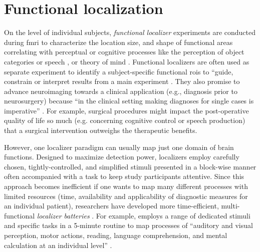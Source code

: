 \section{Functional localization}


On the level of individual subjects, \textit{functional localizer} experiments
\citep[e.g.,][for reviews]{saxe2006divide, friston2006critique} are conducted
during \ac{fmri} to characterize the location size, and shape of functional
areas correlating with perceptual or cognitive processes like the perception of
object categories \citep{kanwisher1997ffa} or speech
\citep{fernandez2001language}, or theory of mind \citep{spunt2014validating}.
Functional localizers are often used as separate experiment to identify a
subject-specific functional \acp{roi} to ``guide, constrain or interpret results
from a main experiment \citep{saxe2006divide}.
They also promise to advance neuroimaging towards a clinical application (e.g.,
diagnosis prior to neurosurgery) because ``in the clinical setting making
diagnoses for single cases is imperative'' \citep{wegrzyn2018thought}.
For example, surgical procedures might impact the post-operative quality of life
so much (e.g. concerning cognitive control or speech production) that a surgical
intervention outweighs the therapeutic benefits.

However, one localizer paradigm can usually map just one domain of brain
functions.
Designed to maximize detection power, localizers employ carefully chosen,
tightly-controlled, and simplified stimuli presented in a block-wise manner
often accompanied with a task to keep study participants attentive.
Since this approach becomes inefficient if one wants to map many different
processes with limited resources (time, availability and applicability of
diagnostic measures for an individual patient), researchers have developed more
time-efficient, multi-functional \textit{localizer batteries}
\citep{barch2013function, drobyshevsky2006rapid, pinho2018individual,
pinho2020individual, pinel2007fast}.
For example, \citet{pinel2007fast} employs a range of dedicated stimuli and
specific tasks in a 5-minute routine to map processes of ``auditory and visual
perception, motor actions, reading, language comprehension, and mental
calculation at an individual level'' \citep{pinel2007fast}.

